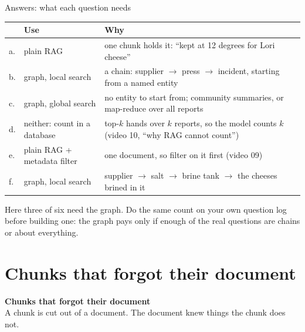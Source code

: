 \documentclass[aspectratio=169]{beamer}
\newcommand{\takebox}[1]{%
  \begin{tcolorbox}[colback=paramgreen!8, colframe=paramgreen, boxrule=0.6pt, arc=2pt]
  #1
  \end{tcolorbox}}
\newcommand{\sectiontransition}[2]{%
  \begin{frame}[plain]
    \vfill
    \begin{center}
      {\Huge\bfseries\color{popblue} #1}\\[1.1em]
      {\large #2}
    \end{center}
    \vfill
  \end{frame}}
\begin{document}
\begin{frame}{Answers: what each question needs}
  \vspace{0.1em}
  \begin{center}
  \footnotesize
  \begin{tabular}{>{\raggedright\arraybackslash}p{}>{\raggedright\arraybackslash}p{}>{\raggedright\arraybackslash}p{}}
    \toprule
    & \textbf{Use} & \textbf{Why} \\
    \midrule
    a. & plain RAG & one chunk holds it: ``kept at 12 degrees for Lori cheese'' \\
    b. & graph, local search & a chain: supplier $\to$ press $\to$ incident, starting from a named entity \\
    c. & graph, global search & no entity to start from; community summaries, or map-reduce over all reports \\
    d. & neither: count in a database & top-$k$ hands over $k$ reports, so the model counts $k$ (video 10, ``why RAG cannot count'') \\
    e. & plain RAG + metadata filter & one document, so filter on it first (video 09) \\
    f. & graph, local search & supplier $\to$ salt $\to$ brine tank $\to$ the cheeses brined in it \\
    \bottomrule
  \end{tabular}
  \end{center}

  \vspace{0.3em}
  \takebox{\small Here three of six need the graph. Do the same count on your own question log before
  building one: the graph pays only if enough of the real questions are chains or about
  everything.}
\end{frame}

\section{Chunks that forgot their document}
\sectiontransition{Chunks that forgot their document}{A chunk is cut out of a document. The
document knew things the chunk does not.}
\end{document}
